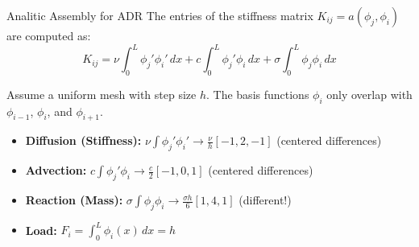 \documentclass[aspectratio=169]{beamer}
\begin{document}
\begin{frame}{Analitic Assembly for ADR}
    The entries of the stiffness matrix $K_{ij} = a(\phi_j, \phi_i)$ are computed as:
    $$ K_{ij} = \nu \int_0^L \phi_j' \phi_i' \, dx + c \int_0^L \phi_j' \phi_i \, dx + \sigma \int_0^L \phi_j \phi_i \, dx $$
    
    Assume a uniform mesh with step size $h$. The basis functions $\phi_i$ only overlap with $\phi_{i-1}$, $\phi_i$, and $\phi_{i+1}$. 
    
    \begin{itemize}
        \item \textbf{Diffusion (Stiffness):} $\nu \int \phi_j' \phi_i' \rightarrow \frac{\nu}{h} [-1, 2, -1]$ \hfill (centered differences)
        \item \textbf{Advection:} $c \int \phi_j' \phi_i \rightarrow \frac{c}{2} [-1, 0, 1]$ \hfill (centered differences)
        \item \textbf{Reaction (Mass):} $\sigma \int \phi_j \phi_i \rightarrow \frac{\sigma h}{6} [1, 4, 1]$  \hfill (different!)
        \item \textbf{Load:} $F_i = \int_0^L \phi_i(x) \, dx = h$
    \end{itemize}
\end{frame}
\end{document}
